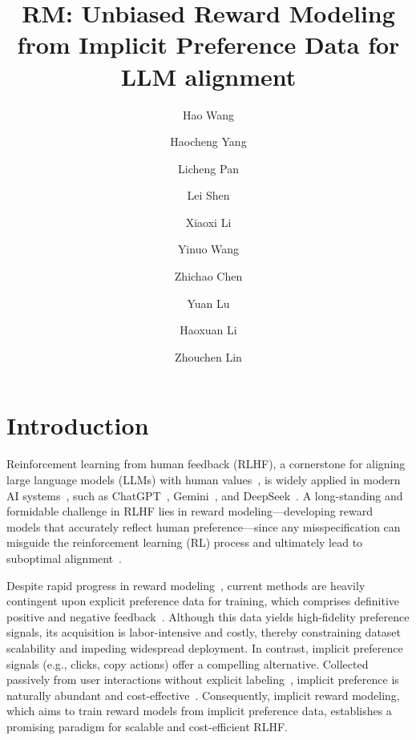 \documentclass[]{arxiv_singlecolumn}
\title{\elegantCausal RM: Unbiased Reward Modeling from Implicit Preference Data for LLM alignment}
\author[1,2]{Hao Wang}
\author[3]{Haocheng Yang}
\author[2,4]{Licheng Pan}
\author[2]{Lei Shen}
\author[2]{Xiaoxi Li}
\author[2]{Yinuo Wang}
\author[1]{Zhichao Chen}
\author[2]{Yuan Lu}
\author[1*]{Haoxuan Li}
\author[1*]{Zhouchen Lin}
\affiliation[1]{Peking University}
\affiliation[2]{Xiaohongshu Inc.}
\affiliation[3]{National University of Singapore}
\affiliation[4]{Zhejiang University}
\theoremstyle{plain}
\theoremstyle{definition}
\theoremstyle{remark}
\begin{document}
\maketitle


\section{Introduction}

Reinforcement learning from human feedback (RLHF), a cornerstone for aligning large language models (LLMs) with human values~\citep{rlhf}, is widely applied in modern AI systems~\citep{lideepagent,liomnigaia,wangtourplanner}, such as ChatGPT~\citep{achiam2023gpt}, Gemini~\citep{comanici2025gemini}, and DeepSeek~\citep{guo2025deepseek}.  A long-standing and formidable challenge in RLHF lies in reward modeling---developing reward models that accurately reflect human preference---since any misspecification can misguide the reinforcement learning (RL) process and ultimately lead to suboptimal alignment~\citep{rewardbench2,wang2026causalrm,inform,genrm}.

Despite rapid progress in reward modeling~\citep{armo,inform,genrm}, current methods are heavily contingent upon explicit preference data for training, which comprises definitive positive and negative feedback~\citep{liu2025user}. Although this data yields high-fidelity preference signals, its acquisition is labor-intensive and costly, thereby constraining dataset scalability and impeding widespread deployment.  In contrast, implicit preference signals (e.g., clicks, copy actions) offer a compelling alternative. Collected passively from user interactions without explicit labeling~\citep{liu2025user}, implicit preference is naturally abundant and cost-effective~\citep{wang2025icmlweak}. Consequently, implicit reward modeling, which aims to train reward models from implicit preference data, establishes a promising paradigm for scalable and cost-efficient RLHF.
\end{document}
